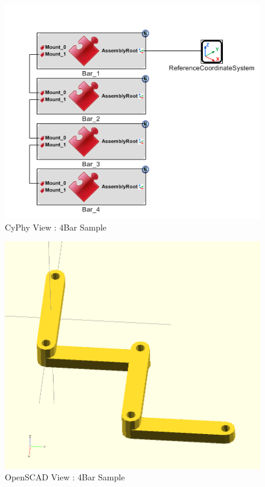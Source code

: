 \documentclass[]{report}
\begin{document}
\begin{figure}[ht!]
	\centering
	\includegraphics[scale=0.7]{images/image00.png}
	\caption{CyPhy View : 4Bar Sample}
	\label{fig:4bar-cyphy}
\end{figure}


\begin{figure}[ht!]
	\centering
	\includegraphics[scale=0.5]{images/image12.png}
	\caption{OpenSCAD View : 4Bar Sample}
	\label{fig:4bar-openscad}
\end{figure}
\end{document}
